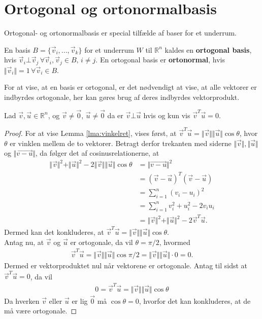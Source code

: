 \section{Ortogonal og ortonormalbasis}
Ortogonal- og ortonormalbasis er special tilfælde af baser for et underrum.
\begin{defn}
En basis $B = \{\vec{v}_i,..., \vec{v}_k\}$ for  et underrum $W$ til $\mathds{R}^n$ kaldes en \textbf{ortogonal basis}, hvis 
$\vec{v}_i \bot \vec{v}_j \, \forall \vec{v}_i, \vec{v}_j \in B, \, i \neq j$. En ortogonal basis er \textbf{ortonormal}, hvis $\Vert\vec{v}_i\Vert = 1 \, \forall \vec{v}_i \in B$.
\end{defn}
For at vise, at en basis er ortogonal, er det nødvendigt at vise, at alle vektorer er indbyrdes ortogonale, her kan gøres brug af deres indbyrdes vektorprodukt.
\begin{lma}
Lad $\vec{v}, \vec{u} \in \mathds{R}^n$, og $\vec{v}\neq \vec{0}$, $\vec{u} \neq \vec{0}$ da er $\vec{v} \bot \vec{u}$ hvis og kun vis $\vec{v}^T\vec{u} = 0$.
\label{lma:vinkelret}
\end{lma}
\begin{proof}
For at vise Lemma \ref{lma:vinkelret}, vises først, at $\vec{v}^T\vec{u} = \Vert\vec{v}\Vert\Vert\vec{u}\Vert\cos{\theta}$, hvor $\theta$ er vinklen mellem de to vektorer. 
Betragt derfor trekanten med siderne $\Vert\vec{v}\Vert , \Vert\vec{u}\Vert$ og $\Vert\vec{v-u}\Vert$, da følger det af cosinusrelationerne, at 
\begin{align*}
\Vert\vec{v}\Vert^2 +  \Vert\vec{u}\Vert^2 - 2\Vert\vec{v}\Vert\Vert\vec{u}\Vert\cos{\theta} &= \Vert\vec{v-u}\Vert^2 
\\ &= (\vec{v}-\vec{u})^T(\vec{v}-\vec{u})
\\&= \sum_{i=1}^n (v_i- u_i)^2 
\\&= \sum_{i=1}^n v_i^2 + u_i^2 - 2 v_iu_i 
\\&= \Vert\vec{v}\Vert^2 +  \Vert\vec{u}\Vert^2 - 2\vec{v}^T\vec{u}.
\end{align*}
Dermed kan det konkluderes,  at $\vec{v}^T\vec{u} = \Vert\vec{v}\Vert\Vert\vec{u}\Vert\cos{\theta}$.
\\Antag nu, at $\vec{v}$ og $\vec{u}$ er ortogonale, da vil $\theta= \pi/2$, hvormed
\begin{align*}
\vec{v}^T\vec{u} = \Vert\vec{v}\Vert\Vert\vec{u}\Vert\cos{\pi/2}= \Vert\vec{v}\Vert\Vert\vec{u}\Vert\cdot0 = 0.
\end{align*}
Dermed er vektorproduktet nul når vektorene er ortogonale.
Antag til sidst at $\vec{v}^T\vec{u}=0$, da vil 
\begin{align*}
0 = \vec{v}^T\vec{u} = \Vert\vec{v}\Vert\Vert\vec{u}\Vert\cos{\theta}
\end{align*}
Da hverken $\vec{v}$ eller $\vec{u}$ er lig $\vec{0}$ må $\cos{\theta} = 0 $, hvorfor det kan konkluderes, at de må være ortogonale.
\end{proof}
